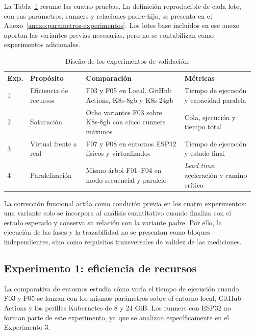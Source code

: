 La Tabla~\ref{tab:diseno-experimentos-validacion} resume las cuatro pruebas. La definición reproducible de cada lote, con sus parámetros, runners y relaciones padre-hija, se presenta en el Anexo~\ref{anexo:parametros-experimentos}. Los lotes base incluidos en ese anexo aportan las variantes previas necesarias, pero no se contabilizan como experimentos adicionales.

\begin{table}[htbp]
    \centering
    \caption{Diseño de los experimentos de validación.}
    \label{tab:diseno-experimentos-validacion}
    \begin{tabular}{p{}p{}p{}p{}}
        \hline
        \textbf{Exp.} & \textbf{Propósito} & \textbf{Comparación} & \textbf{Métricas} \\
        \hline
        1 & Eficiencia de recursos & F03 y F05 en Local, GitHub Actions, K8s-8gb y K8s-24gb & Tiempo de ejecución y capacidad paralela \\
        2 & Saturación & Ocho variantes F03 sobre K8s-8gb con cinco runners máximos & Cola, ejecución y tiempo total \\
        3 & Virtual frente a real & F07 y F08 en entornos ESP32 físicos y virtualizados & Tiempo de ejecución y estado final \\
        4 & Paralelización & Mismo árbol F01--F04 en modo secuencial y paralelo & \textit{Lead time}, aceleración y camino crítico \\
        \hline
    \end{tabular}
\end{table}

La corrección funcional actúa como condición previa en los cuatro experimentos: una variante solo se incorpora al análisis cuantitativo cuando finaliza con el estado esperado y conserva su relación con la variante padre. Por ello, la ejecución de las fases y la trazabilidad no se presentan como bloques independientes, sino como requisitos transversales de validez de las mediciones.

\subsection{Experimento 1: eficiencia de recursos}
\label{subsec:comparativa-entornos}

La comparativa de entornos estudia cómo varía el tiempo de ejecución cuando F03 y F05 se lanzan con los mismos parámetros sobre el entorno local, GitHub Actions y los perfiles Kubernetes de 8 y 24 GiB. Los runners con ESP32 no forman parte de este experimento, ya que se analizan específicamente en el Experimento 3.

